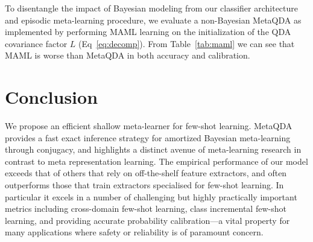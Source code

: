\documentclass[10pt,twocolumn,letterpaper]{article}
\def\miniIN{\textit{mini}ImageNet}
\begin{document}
 To disentangle the impact of Bayesian modeling from our classifier architecture and episodic meta-learning procedure, we evaluate a non-Bayesian MetaQDA as implemented by performing MAML learning on the  initialization of the QDA covariance factor $L$ (Eq~\ref{eq:decomp}). From Table~\ref{tab:maml} we can see that MAML is worse than MetaQDA in both accuracy and calibration.

\setlength{\tabcolsep}{4.8pt}
\begin{table}[h]
\centering
\footnotesize
{}
\caption{\small \small 
\bf{Comparison of Bayesian vs. non-Bayesian (MAML-based) realisaton of MetaQDA on \miniIN.}
}
\vspace{-1.5em}
\label{tab:maml}
\end{table}



\section{Conclusion}
We propose an efficient shallow meta-learner for few-shot learning. MetaQDA provides a fast exact inference strategy for amortized Bayesian meta-learning through conjugacy, and highlights a distinct avenue of meta-learning research in contrast to meta representation learning. 
The empirical performance of our model exceeds that of others that rely on off-the-shelf feature extractors, and often outperforms those that train extractors specialised for few-shot learning. In particular it excels in a number of challenging but highly practically important metrics including cross-domain few-shot learning, class incremental few-shot learning, and providing accurate probability calibration---a vital property for many applications where safety or reliability is of paramount concern.
\end{document}
